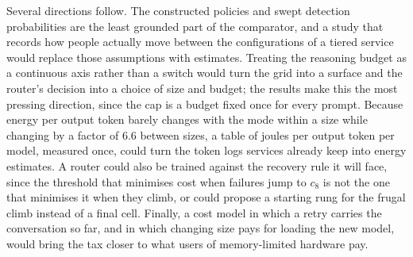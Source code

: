 Several directions follow. The constructed policies and swept detection
probabilities are the least grounded part of the comparator, and a study that
records how people actually move between the configurations of a tiered
service would replace those assumptions with estimates. Treating the
reasoning budget as a continuous axis rather than a switch would turn the
grid into a surface and the router's decision into a choice of size and
budget; the results make this the most pressing direction, since the cap is a
budget fixed once for every prompt. Because energy per output token barely
changes with the mode within a size while changing by a factor of 6.6 between
sizes, a table of joules per output token per model, measured once, could
turn the token logs services already keep into energy estimates. A router
could also be trained against the recovery rule it will face, since the
threshold that minimises cost when failures jump to $c_8$ is not the one that
minimises it when they climb, or could propose a starting rung for the frugal
climb instead of a final cell. Finally, a cost model in which a retry carries
the conversation so far, and in which changing size pays for loading the new
model, would bring the tax closer to what users of memory-limited hardware
pay.
